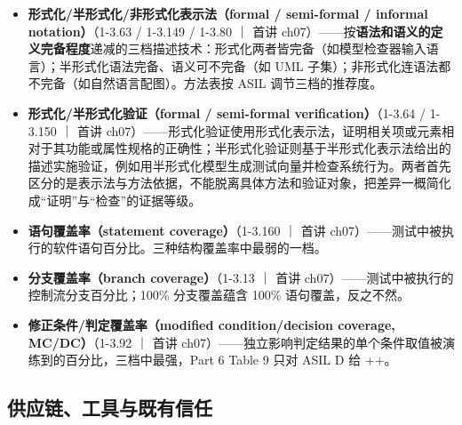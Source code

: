 \begin{itemize}
\item \textbf{形式化/半形式化/非形式化表示法（formal / semi-formal / informal notation）}（1-3.63 / 1-3.149 / 1-3.80 ｜ 首讲 ch07）——按\textbf{语法和语义的定义完备程度}递减的三档描述技术：形式化两者皆完备（如模型检查器输入语言）；半形式化语法完备、语义可不完备（如 UML 子集）；非形式化连语法都不完备（如自然语言配图）。方法表按 ASIL 调节三档的推荐度。
\item \textbf{形式化/半形式化验证（formal / semi-formal verification）}（1-3.64 / 1-3.150 ｜ 首讲 ch07）——形式化验证使用形式化表示法，证明相关项或元素相对于其功能或属性规格的正确性；半形式化验证则基于半形式化表示法给出的描述实施验证，例如用半形式化模型生成测试向量并检查系统行为。两者首先区分的是表示法与方法依据，不能脱离具体方法和验证对象，把差异一概简化成“证明”与“检查”的证据等级。
\item \textbf{语句覆盖率（statement coverage）}（1-3.160 ｜ 首讲 ch07）——测试中被执行的软件语句百分比。三种结构覆盖率中最弱的一档。
\item \textbf{分支覆盖率（branch coverage）}（1-3.13 ｜ 首讲 ch07）——测试中被执行的控制流分支百分比；100\% 分支覆盖蕴含 100\% 语句覆盖，反之不然。
\item \textbf{修正条件/判定覆盖率（modified condition/decision coverage, MC/DC）}（1-3.92 ｜ 首讲 ch07）——独立影响判定结果的单个条件取值被演练到的百分比，三档中最强，Part 6 Table 9 只对 ASIL D 给 ++。
\end{itemize}

\subsection{供应链、工具与既有信任}

